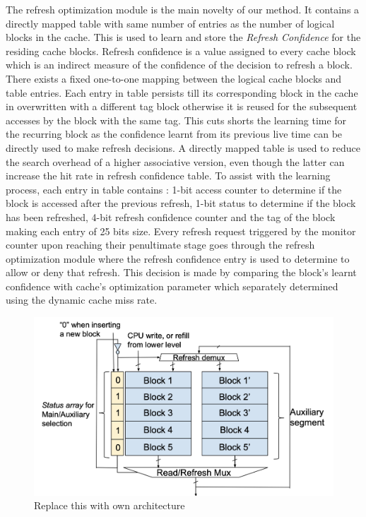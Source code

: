 \documentclass[sigconf]{acmart}
\begin{document}
The refresh optimization module is the main novelty of our method. It contains a directly mapped table with same number of entries as the number of logical blocks in the cache. This is used to learn and store the \textit{Refresh Confidence} for the residing cache blocks. Refresh confidence is a value assigned to every cache block which is an indirect measure of the confidence of the decision to refresh a block. There exists a fixed one-to-one mapping between the logical cache blocks and table entries. Each entry in table persists till its corresponding block in the cache in overwritten with a different tag block otherwise it is reused for the subsequent accesses by the block with the same tag. This cuts shorts the learning time for the recurring block as the confidence learnt from its previous live time can be directly used to make refresh decisions. A directly mapped table is used to reduce the search overhead of a higher associative version, even though the latter can increase the hit rate in refresh confidence table. To assist with the learning process, each entry in table contains : 1-bit access counter to determine if the block is accessed after the previous refresh, 1-bit status to determine if the block has been refreshed, 4-bit refresh confidence counter and the tag of the block making each entry of 25 bits size. Every refresh request triggered by the monitor counter upon reaching their penultimate stage goes through the refresh optimization module where the refresh confidence entry is used to determine to allow or deny that refresh. This decision is made by comparing the block's learnt confidence with cache's optimization parameter which separately determined using the dynamic cache miss rate.

\begin{figure}[tp]
\includegraphics[width=\columnwidth]{res/architecture.png}
\caption{Replace this with own architecture}
\end{figure}
\end{document}
